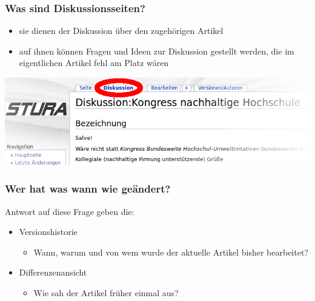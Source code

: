 \documentclass{beamer}
\begin{document}
\begin{frame}
  \frametitle{Was sind Diskussionsseiten?}

  \begin{itemize}[<+->]
    \item sie dienen der Diskussion über den zugehörigen Artikel
    \item auf ihnen können Fragen und Ideen zur Diskussion gestellt werden,
      die im eigentlichen Artikel fehl am Platz wären
  \end{itemize}

  \begin{center}
    \includegraphics[width=\linewidth]{Wiki-Kopfzeile_Diskussionslink_markiert}
  \end{center}

\end{frame}


\begin{frame}
  \frametitle{Wer hat was wann wie geändert?}

  Antwort auf diese Frage geben die:
  \begin{itemize}[<+->]
    \item Versionshistorie %
    \begin{itemize}
      \item Wann, warum und von wem wurde der aktuelle Artikel bisher bearbeitet?
    \end{itemize}
    \item Differenzenansicht
    \begin{itemize}
      \item Wie sah der Artikel früher einmal aus?
    \end{itemize}
  \end{itemize}
\end{frame}
\end{document}
